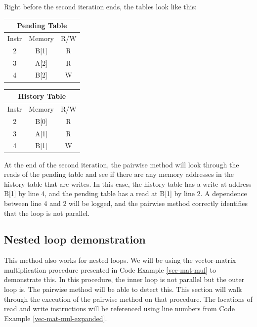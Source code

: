 \documentclass[12pt,twoside]{reedthesis}
\begin{document}
		Right before the second iteration ends, the tables look like this:
			
		\begin{minipage}{1.0\linewidth}
		\begin{minipage}[t]{.5\linewidth}
		\begin{tabular}{ |c|c|c| } 
			\hline
			\multicolumn{3}{|c|}{Pending Table} \\
			\hline
			Instr & Memory & R/W \\ 
			\hline
			2 & B[1] & R \\ 
			3 & A[2] & R \\ 
			4 & B[2] & W \\ 
			\hline
		\end{tabular}
		\end{minipage}%
		\begin{minipage}[t]{.5\linewidth}
		\begin{tabular}{ |c|c|c| } 
			\hline
			\multicolumn{3}{|c|}{History Table} \\
			\hline
			Instr & Memory & R/W \\ 
			\hline
			2 & B[0] & R \\ 
			3 & A[1] & R \\ 
			4 & B[1] & W \\ 
			\hline
		\end{tabular}
		\end{minipage}%
		\end{minipage}%
	
		At the end of the second iteration, the pairwise method will look through the reads of the pending table and see if there are any memory addresses in the history table that are writes. In this case, the history table has a write at address B[1] by line 4, and the pending table has a read at B[1] by line 2. A dependence between line 4 and 2 will be logged, and  the pairwise method correctly identifies that the loop is not parallel. 
		
		\subsection{Nested loop demonstration}
		
		This method also works for nested loops. We will be using the vector-matrix multiplication procedure presented in Code Example \ref{vec-mat-mul} to demonstrate this. In this procedure, the inner loop is not parallel but the outer loop is. The pairwise method will be able to detect this. This section will walk through the execution of the pairwise method on that procedure. The locations of read and write instructions will be referenced using line numbers from Code Example \ref{vec-mat-mul-expanded}.
		
\end{document}
